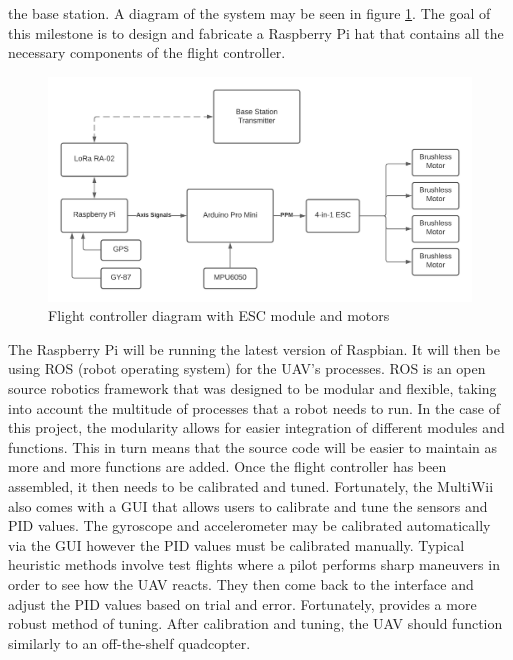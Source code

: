 \documentclass[english]{upeeei}
\begin{document}
the base station. A diagram of the system may be seen in figure \ref{fig:final_FC_diagram}. The goal of this milestone is
to design and fabricate a Raspberry Pi hat that contains all the necessary components of the flight controller.
\begin{figure}[h]
    \centering
    \includegraphics[scale=0.5]{images/final_FC diagram.png}
    \caption{Flight controller diagram with ESC module and motors}
    \label{fig:final_FC_diagram}
\end{figure}
\newline
\newline
The Raspberry Pi will be running the latest version of Raspbian. It will then be using ROS (robot operating system) for
the UAV's processes. ROS is an open source robotics framework that was designed to be modular and flexible, taking into
account the multitude of processes that a robot needs to run. In the case of this project, the modularity allows for
easier integration of different modules and functions. This in turn means that the source code will be easier to maintain
as more and more functions are added.
\newline
\newline
Once the flight controller has been assembled, it then needs to be calibrated and tuned. Fortunately, the MultiWii also
comes with a GUI that allows users to calibrate and tune the sensors and PID values. The gyroscope and accelerometer may
be calibrated automatically via the GUI however the PID values must be calibrated manually. Typical heuristic methods
involve test flights where a pilot performs sharp maneuvers in order to see how the UAV reacts. They then come back to the
interface and adjust the PID values based on trial and error. Fortunately, \cite{Tuning2017} provides a more robust method
of tuning. After calibration and tuning, the UAV should function similarly to an off-the-shelf quadcopter.
\end{document}
